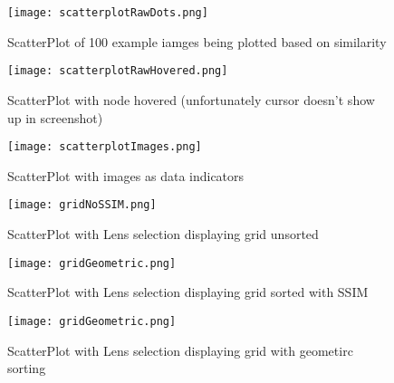 \documentclass[
  a4paper,  %
  twoside,  %
  bibliography=totoc,
  headsepline,
  cleardoublepage=empty,
  parskip=half,
  draft=false
]{scrbook}
\begin{document}
\begin{figure}[H]
	\centering
	\texttt{[image: scatterplotRawDots.png]}
	\caption{ScatterPlot of 100 example iamges being plotted based on similarity }
	\label{fig:scatterDots}
\end{figure}
\begin{figure}[H]
	\centering
	\texttt{[image: scatterplotRawHovered.png]}
	\caption{ScatterPlot with node hovered (unfortunately cursor doesn't show up in screenshot) }
	\label{fig:scatterHovered}
\end{figure}
\begin{figure}[H]
	\centering
	\texttt{[image: scatterplotImages.png]}
	\caption{ScatterPlot with images as data indicators  }
	\label{fig:scatterImages}
\end{figure}
\begin{figure}[H]
	\centering
	\texttt{[image: gridNoSSIM.png]}
	\caption{ScatterPlot with Lens selection displaying grid unsorted }
	\label{fig:scatterNoSSIM}
\end{figure}
\begin{figure}[H]
	\centering
	\texttt{[image: gridGeometric.png]}
	\caption{ScatterPlot with Lens selection displaying grid sorted with SSIM}
	\label{fig:scatterNoSSIM}
\end{figure}
\begin{figure}[H]
	\centering
	\texttt{[image: gridGeometric.png]}
	\caption{ScatterPlot with Lens selection displaying grid with geometirc sorting}
	\label{fig:scatterNoSSIM}
\end{figure}
\end{document}
